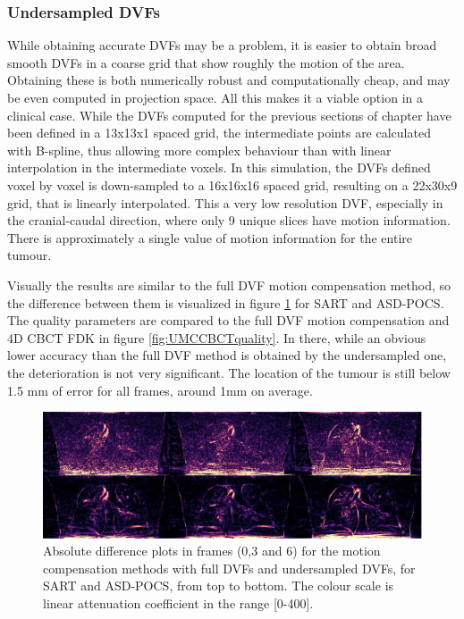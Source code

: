 \subsubsection{Undersampled DVFs}
While obtaining accurate DVFs may be a problem, it is easier to obtain broad smooth DVFs in a coarse grid that show roughly the motion of the area. Obtaining these is both numerically robust and computationally cheap, and may be even computed in projection space. All this makes it a viable option in a clinical case. While the DVFs computed for the previous sections of chapter have been defined in a 13x13x1 spaced grid, the intermediate points are calculated with B-spline, thus allowing more complex behaviour than with linear interpolation in the intermediate voxels. In this simulation, the DVFs defined voxel by voxel is down-sampled to a 16x16x16 spaced grid, resulting on a 22x30x9 grid, that is linearly interpolated. This a very low resolution DVF, especially in the cranial-caudal direction, where only 9 unique slices have motion information. There is approximately a single value of motion information for the entire tumour.

Visually the results are similar to the full DVF motion compensation method, so the difference between them is visualized in figure \ref{fig:UMCCBCT3static} for SART and ASD-POCS. The quality parameters are compared to the full DVF motion compensation and 4D CBCT FDK in figure \ref{fig:UMCCBCTquality}. In there, while an obvious lower accuracy than the full DVF method is obtained by the undersampled one, the deterioration is not very significant. The location of the tumour is still below 1.5 mm of error for all frames, around 1mm on average.

\begin{figure}
\begin{center}

\includegraphics[width=\textwidth]{accuracyMC/diffUMCCBCT3stage.png} 


\end{center}

\caption[Three difference frames of the undersampled motion compensation methods]{\label{fig:UMCCBCT3static} Absolute difference plots in frames (0,3 and 6) for the motion compensation methods with full DVFs and undersampled DVFs, for SART and ASD-POCS, from top to bottom.  The colour scale is linear attenuation coefficient in the range [0-400].} 
\end{figure}


